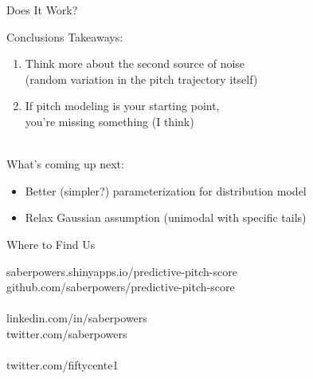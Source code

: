 \documentclass{beamer}
\begin{document}
  \begin{frame}{Does It Work?}
  \end{frame}

  \begin{frame}{Conclusions}
    Takeaways:
    \begin{enumerate}
      \item Think more about the second source of noise\\
        (random variation in the pitch trajectory itself)
      \item If pitch modeling is your starting point,\\
        you're missing something {\color{ricegray} (I think)}
    \end{enumerate}
    ~\\
    What's coming up next:
    \begin{itemize}
      \item Better (simpler?) parameterization for distribution model
      \item Relax Gaussian assumption (unimodal with specific tails)
    \end{itemize}
  \end{frame}

  \begin{frame}{Where to Find Us}

    {\color{ricerichblue}saberpowers}{\color{ricegray}.shinyapps.io/}{\color{ricerichblue}predictive-pitch-score}\\
    {\color{ricegray} github.com/}{\color{ricerichblue}saberpowers/predictive-pitch-score}\\
    ~\\
    {\color{ricegray} linkedin.com/in/}{\color{ricerichblue}saberpowers}\\
    {\color{ricegray} twitter.com/}{\color{ricerichblue}saberpowers}\\
    ~\\
    {\color{ricegray} twitter.com/}{\color{ricerichblue}fiftycente1}
  \end{frame}
\end{document}
